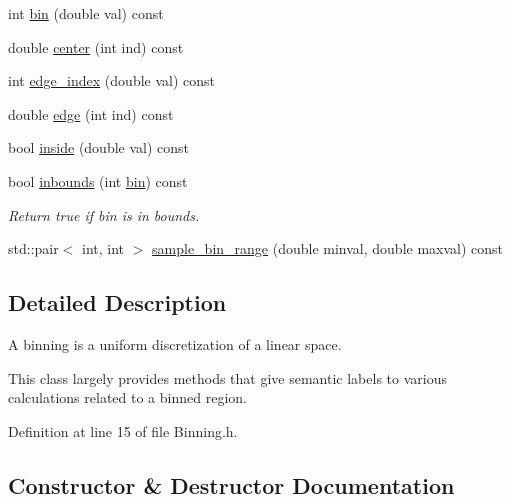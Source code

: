 \begin{DoxyCompactItemize}
\item 
int \hyperlink{class_wire_cell_1_1_binning_a826dbaafb7bc50a2c2767cc4deb190f0}{bin} (double val) const
\item 
double \hyperlink{class_wire_cell_1_1_binning_ac53704b170f6bd834632fdc75f7a70cc}{center} (int ind) const
\item 
int \hyperlink{class_wire_cell_1_1_binning_afb7e010178a3e28729f67d5397b9d3d6}{edge\+\_\+index} (double val) const
\item 
double \hyperlink{class_wire_cell_1_1_binning_a0ed21ab262df2a11eac561e53ee3cb77}{edge} (int ind) const
\item 
bool \hyperlink{class_wire_cell_1_1_binning_a251f5ec35ccc3ddb07326ad6f512a0bd}{inside} (double val) const
\item 
bool \hyperlink{class_wire_cell_1_1_binning_aa3696d13f4a4dc658d47c430663dc78e}{inbounds} (int \hyperlink{class_wire_cell_1_1_binning_a826dbaafb7bc50a2c2767cc4deb190f0}{bin}) const
\begin{DoxyCompactList}\small\item\em Return true if bin is in bounds. \end{DoxyCompactList}\item 
std\+::pair$<$ int, int $>$ \hyperlink{class_wire_cell_1_1_binning_a7f4e8459c55ad288fff22553d8ed8cdd}{sample\+\_\+bin\+\_\+range} (double minval, double maxval) const
\end{DoxyCompactItemize}


\subsection{Detailed Description}
A binning is a uniform discretization of a linear space.

This class largely provides methods that give semantic labels to various calculations related to a binned region. 

Definition at line 15 of file Binning.\+h.



\subsection{Constructor \& Destructor Documentation}
\mbox{\label{class_wire_cell_1_1_binning_a76d15fa7ac7d60e63f7d77c28f2acac8}} 

